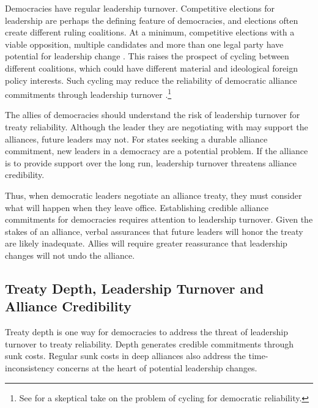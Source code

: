 \documentclass[12pt]{article}
\begin{document}
Democracies have regular leadership turnover. 
Competitive elections for leadership are perhaps the defining feature of democracies, and elections often create different ruling coalitions. 
At a minimum, competitive elections with a viable opposition, multiple candidates and more than one legal party have potential for leadership change \citep{HydeMarinov2012}. 
This raises the prospect of cycling between different coalitions, which could have different material and ideological foreign policy interests. 
Such cycling may reduce the reliability of democratic alliance commitments through leadership turnover \citep{GartzkeGleditsch2004}.\footnote{See \citet{Gaubatz1996} for a skeptical take on the problem of cycling for democratic reliability.}


The allies of democracies should understand the risk of leadership turnover for treaty reliability. 
Although the leader they are negotiating with may support the alliances, future leaders may not. 
For states seeking a durable alliance commitment, new leaders in a democracy are a potential problem. 
If the alliance is to provide support over the long run, leadership turnover threatens alliance credibility.


Thus, when democratic leaders negotiate an alliance treaty, they must consider what will happen when they leave office.
Establishing credible alliance commitments for democracies requires attention to leadership turnover. 
Given the stakes of an alliance, verbal assurances that future leaders will honor the treaty are likely inadequate.
Allies will require greater reassurance that leadership changes will not undo the alliance. 



\subsection{Treaty Depth, Leadership Turnover and Alliance Credibility}

Treaty depth is one way for democracies to address the threat of leadership turnover to treaty reliability. 
Depth generates credible commitments through sunk costs.
Regular sunk costs in deep alliances also address the time-inconsistency concerns at the heart of potential leadership changes.
\end{document}
